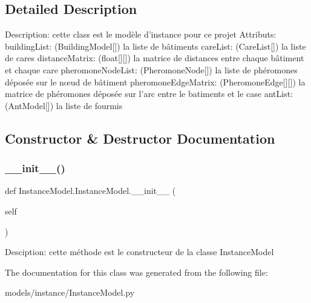 \subsection{Detailed Description}
\begin{DoxyVerb}Description: cette class est le modèle d'instance pour ce projet
Attributs:
    buildingList: (BuildingModel[]) la liste de bâtiments
    careList: (CareList[]) la liste de cares
    distanceMatrix: (float[][]) la matrice de distances entre chaque bâtiment et chaque care
    pheromoneNodeList: (PheromoneNode[]) la liste de phéromones déposée sur le nœud de bâtiment
    pheromoneEdgeMatrix: (PheromoneEdge[][]) la  matrice de phéromones déposée sur l'arc entre le batiments et le case
    antList: (AntModel[]) la liste de fourmis
\end{DoxyVerb}
 

\subsection{Constructor \& Destructor Documentation}
\mbox{\label{class_instance_model_1_1_instance_model_a1dc30e37013930d2e46caa7041298157}} 
\subsubsection{\texorpdfstring{\+\_\+\+\_\+init\+\_\+\+\_\+()}{\_\_init\_\_()}}
{\footnotesize\ttfamily def Instance\+Model.\+Instance\+Model.\+\_\+\+\_\+init\+\_\+\+\_\+ (\begin{DoxyParamCaption}\item[{}]{self }\end{DoxyParamCaption})}

\begin{DoxyVerb}Desciption: cette méthode est le constructeur de la classe InstanceModel
\end{DoxyVerb}
 

The documentation for this class was generated from the following file\+:\begin{DoxyCompactItemize}
\item 
models/instance/Instance\+Model.\+py\end{DoxyCompactItemize}
